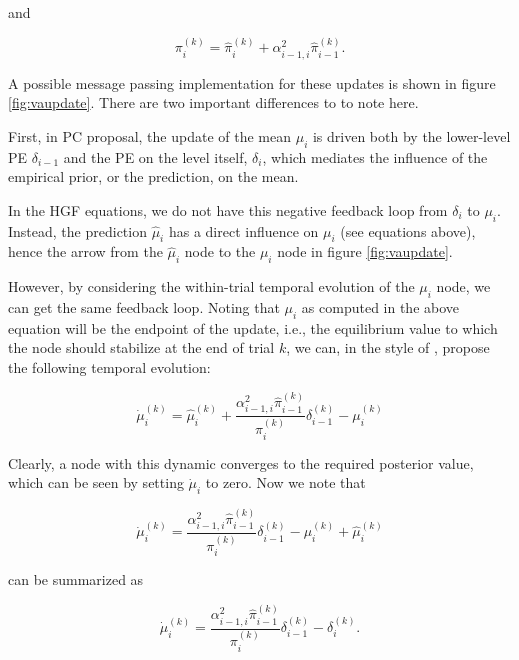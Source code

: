 and

\begin{equation}
	\pi_i^{(k)} = \hat{\pi}_i^{(k)} + \alpha_{i-1,i}^2 \hat{\pi}_{i-1}^{(k)}.
\end{equation}

A possible message passing implementation for these updates is shown in figure \ref{fig:vaupdate}. There are two important differences to \cite{Shipp2016} to note here.\\


First, in \textsf{PC} proposal, the update of the mean $\mu_i$ is driven both by the lower-level PE $\delta_{i-1}$ and the PE on the level itself, $\delta_i$, which mediates the influence of the empirical prior, or the prediction, on the mean. 

In the HGF equations, we do not have this negative feedback loop from $\delta_i$ to $\mu_i$. Instead, the prediction $\hat{\mu}_i$ has a direct influence on $\mu_i$ (see equations above), hence the arrow from the $\hat{\mu}_i$ node to the $\mu_i$ node in figure \ref{fig:vaupdate}. 

However, by considering the within-trial temporal evolution of the $\mu_i$ node, we can get the same feedback loop. Noting that $\mu_i$ as computed in the above equation will be the endpoint of the update, i.e., the equilibrium value to which the node should stabilize at the end of trial $k$, we can, in the style of \cite{Bogacz2017}, propose the following temporal evolution:

\begin{equation}
	\dot{\mu}_i^{(k)} = \hat{\mu}_i^{(k)} + \frac{\alpha_{i-1,i}^2 \hat{\pi}_{i-1}^{(k)}}{\pi_i^{(k)}} \delta_{i-1}^{(k)} - \mu_i^{(k)}
\end{equation}

Clearly, a node with this dynamic converges to the required posterior value, which can be seen by setting $\dot{\mu}_i$ to zero. Now we note that

\begin{equation}
	\dot{\mu}_i^{(k)} = \frac{\alpha_{i-1,i}^2 \hat{\pi}_{i-1}^{(k)}}{\pi_i^{(k)}} \delta_{i-1}^{(k)} - \mu_i^{(k)} + \hat{\mu}_i^{(k)}
\end{equation}

can be summarized as 

\begin{equation}
	\dot{\mu}_i^{(k)} = \frac{\alpha_{i-1,i}^2 \hat{\pi}_{i-1}^{(k)}}{\pi_i^{(k)}} \delta_{i-1}^{(k)} - \delta_i^{(k)}.
\end{equation}

